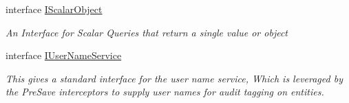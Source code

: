 \begin{DoxyCompactItemize}
interface \hyperlink{interface_highway_1_1_data_1_1_interfaces_1_1_i_scalar_object-g}{I\-Scalar\-Object}
\begin{DoxyCompactList}\small\item\em An Interface for Scalar Queries that return a single value or object \end{DoxyCompactList}\item 
interface \hyperlink{interface_highway_1_1_data_1_1_interfaces_1_1_i_user_name_service}{I\-User\-Name\-Service}
\begin{DoxyCompactList}\small\item\em This gives a standard interface for the user name service, Which is leveraged by the Pre\-Save interceptors to supply user names for audit tagging on entities. \end{DoxyCompactList}\end{DoxyCompactItemize}
